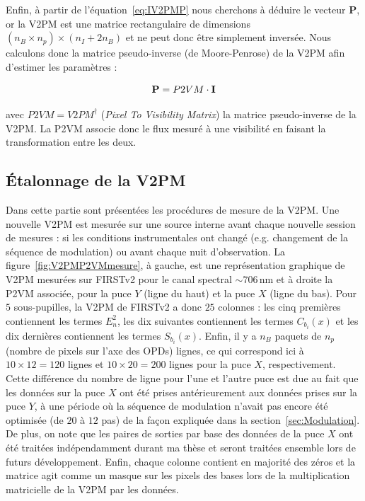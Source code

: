 Enfin, à partir de l'équation~\ref{eq:IV2PMP} nous cherchons à déduire le vecteur $\textbf{P}$, or la \ac{V2PM} est une matrice rectangulaire de dimensions $(n_B \times n_p) \times (n_I + 2 n_B)$ et ne peut donc être simplement inversée. Nous calculons donc la matrice pseudo-inverse (de Moore-Penrose) de la \ac{V2PM} afin d'estimer les paramètres :

\begin{equation}
    \text{\textbf{P}} = P2VM \cdot \text{\textbf{I}} \label{eq:VisibiliteMes}
\end{equation}

avec $P2VM = V2PM^\dag$ (\textit{Pixel To Visibility Matrix}) la matrice pseudo-inverse de la \ac{V2PM}. La \ac{P2VM} associe donc le flux mesuré à une visibilité en faisant la transformation entre les deux.


\subsection{Étalonnage de la V2PM}
\label{sec:V2PMEtalonnage}

Dans cette partie sont présentées les procédures de mesure de la \ac{V2PM}. Une nouvelle \ac{V2PM} est mesurée sur une source interne avant chaque nouvelle session de mesures : si les conditions instrumentales ont changé (e.g. changement de la séquence de modulation) ou avant chaque nuit d'observation. La figure~\ref{fig:V2PMP2VMmesure}, à gauche, est une représentation graphique de \ac{V2PM} mesurées sur \ac{FIRSTv2} pour le canal spectral $\sim 706 \,$nm et à droite la \ac{P2VM} associée, pour la puce $Y$ (ligne du haut) et la puce $X$ (ligne du bas). Pour $5$ sous-pupilles, la \ac{V2PM} de \ac{FIRSTv2} a donc $25$ colonnes : les cinq premières contiennent les termes $E_{n}^2$, les dix suivantes contiennent les termes $C_{b_i}(x)$ et les dix dernières contiennent les termes $S_{b_i}(x)$. Enfin, il y a $n_B$ paquets de $n_p$ (nombre de pixels sur l'axe des \ac{OPD}s) lignes, ce qui correspond ici à $10 \times 12 = 120$ lignes et $10 \times 20 = 200$ lignes pour la puce $X$, respectivement. Cette différence du nombre de ligne pour l'une et l'autre puce est due au fait que les données sur la puce $X$ ont été prises antérieurement aux données prises sur la puce $Y$, à une période où la séquence de modulation n'avait pas encore été optimisée (de $20$ à $12$ pas) de la façon expliquée dans la section~\ref{sec:Modulation}. De plus, on note que les paires de sorties par base des données de la puce $X$ ont été traitées indépendamment durant ma thèse et seront traitées ensemble lors de futurs développement. Enfin, chaque colonne contient en majorité des zéros et la matrice agit comme un masque sur les pixels des bases lors de la multiplication matricielle de la \ac{V2PM} par les données.

